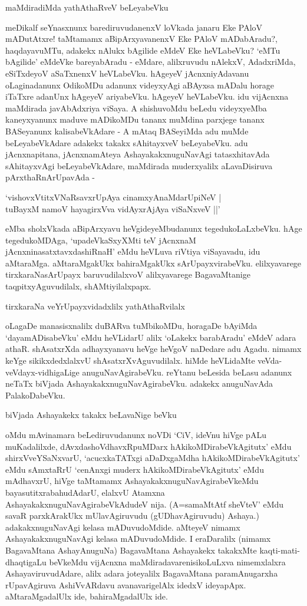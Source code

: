 maMdiradiMda yathAthaRveV beLeyabeVku

meDikalf seYnasxnunx barediruvudanenxV loVkada janaru Eke PAloV mADutAtxre! taMtamamx aBipArxyavanenxV Eke PAloV mADabAradu?, haqdayavuMTu, adakekx nAlukx bAgilide eMdeV Eke heVLabeVku? `eMTu bAgilide' eMdeVke bareyabAradu - eMdare, alilxruvudu nAlekxV, AdadxriMda, eSiTxdeyoV aSaTxnenxV heVLabeVku. hAgeyeV jAcnxniyAdavanu oLaginadanunx OdikoMDu adanunx videyxyAgi aBAyxsa mADalu horage iTaTxre adanUnx hAgeyeV ariyabeVku. hAgeyeV heVLabeVku. idu vijAcnxna maMdirada javAbAdxriya viSaya. A shishuvoMdu beLedu videyxyeMba kaneyxyanunx maduve mADikoMDu tananx muMdina parxjege tananx BASeyanunx kalisabeVkAdare - A mAtaq BASeyiMda adu muMde beLeyabeVkAdare adakekx takakx sAhitayxveV beLeyabeVku. adu jAcnxnapitana, jAcnxnamAteya AshayakakxnuguNavAgi tatasxhitavAda sAhitayxvAgi beLeyabeVkAdare, maMdirada muderxyalilx aLavaDisiruva pArxthaRnArUpavAda -

\begin{shloka}
`vishovxVtitxVNaRsavxrUpAya cinamxyAnaMdarUpiNeV |\\
tuBayxM namoV hayagirxVva vidAyxrAjAya viSaNxveV ||'
\end{shloka}

eMba sholxVkada aBipArxyavu heVgideyeMbudanunx tegedukoLaLxbeVku. hAge tegedukoMDAga, `upadeVkaSxyXMti teV jAcnxnaM jAcnxninasatxtavxdashiRnaH' eMdu heVLuva riVtiya viSayavadu, idu aMtaraMga. aMtaraMgakUkx bahiraMgakUkx sArUpayxvirabeVku. elilxyavarege tirxkaraNasArUpayx baruvudilalxvoV alilxyavarege BagavaMtanige taqpitxyAguvudilalx, shAMtiyilalxpapx.

tirxkaraNa veYrUpayxvidadxlilx yathAthaRvilalx

oLagaDe manasisxnalilx duBARva tuMbikoMDu, horagaDe bAyiMda `dayamADisabeVku' eMdu heVLidarU alilx `oLakekx barabAradu' eMdeV adara athaR. shAsatxrXda adhayxyanavu heVge heVgoV naDedare adu Agadu. nimamx keYge sikikxdedxlalxvU shAsatxrXvAguvudilalx. hiMde heVLidaMte veVda-veVdayx-vidhigaLige anuguNavAgirabeVku. reYtanu beLesida beLasu adanunx neTaTx biVjada AshayakakxnuguNavAgirabeVku. adakekx anuguNavAda PalakoDabeVku.

biVjada Ashayakekx takakx beLavaNige beVku

oMdu mAvinamara beLediruvudanunx noVDi `CiV, ideVnu hiVge pALu muKadalilxde, dAvxdashoVdhavxRpuMDarx hAkikoMDirabeVkAgitutx' eMdu shirxVveYSaNxvarU, `acucxkaTATxgi aDaDxgaMdha hAkikoMDirabeVkAgitutx' eMdu sAmxtaRrU `cenAnxgi muderx hAkikoMDirabeVkAgitutx' eMdu mAdhavxrU, hiVge taMtamamx AshayakakxnuguNavAgirabeVkeMdu bayasutitxrabahudAdarU, elalxvU Atamxna AshayakakxnuguNavAgirabeVkAdudeV nija. (A=samaMtAtf sheVteV' eMdu savaR parxkArakUkx mUlavAgiruvudu (gUDhavAgiruvudu) Ashaya.) adakakxnuguNavAgi kelasa mADuvudoMdide. aMteyeV nimamx AshayakakxnuguNavAgi kelasa mADuvudoMdide. I eraDaralilx (nimamx BagavaMtana AshayAnuguNa) BagavaMtana Ashayakekx takakxMte kaqti-mati-dhaqtigaLu beVkeMdu vijAcnxna maMdiradavarenisikoLuLxva nimemxlalxra AshayaviruvudAdare, alilx adara joteyalilx BagavaMtana paramAnugarxha rUpavAgiruva AshiVvARdavu avanavarigelAlx idedxV ideyapApx. aMtaraMgadalUlx ide, bahiraMgadalUlx ide. 

